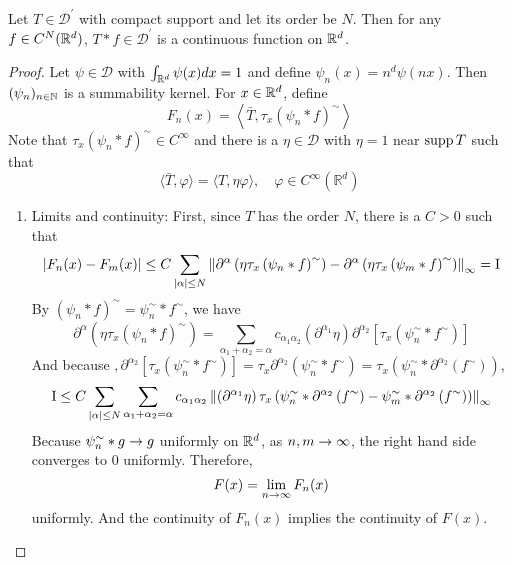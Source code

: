 \begin{enumerate}[label=\arabic*.]
	\begin{prop}
		Let $T \in \mathcal{D}^\prime$ with compact support and let its order be $N$. Then for any $f \in C^N(\mathbb{R}^d)$, $T * f \in \mathcal{D}^\prime$ is a continuous function on $\mathbb{R}^d$.
	\end{prop}
	\begin{proof}
		Let $\psi \in \mathcal{D}$ with $\int_{\mathbb{R}^d}\psi(x)dx = 1$ and define $\psi_n(x) = n^d\psi(nx)$. Then $(\psi_n)_{n \in \mathbb{N}}$ is a summability kernel. For $x \in \mathbb{R}^d$, define
		\begin{equation*}
			F_n(x)=\left\langle\bar{T}, \tau_x\left(\psi_n * f\right)^{\sim}\right\rangle
		\end{equation*}
		Note that $\tau_x\left(\psi_n * f\right)^{\sim} \in C^\infty$ and there is a $\eta \in \mathcal{D}$ with $\eta = 1$ near $\operatorname{supp} T$ such that
		\begin{equation*}
			\langle\bar{T}, \varphi\rangle=\langle T, \eta \varphi\rangle, \quad \varphi \in C^{\infty}\left(\mathbb{R}^d\right)
		\end{equation*}
		\begin{enumerate}
			\item Limits and continuity: First, since $T$ has the order $N$, there is a $C > 0$ such that
			\begin{equation*}
				\left|F_n(x)-F_m(x)\right| \leq C \sum_{|\alpha| \leq N}\left\|\partial^\alpha\left(\eta \tau_x\left(\psi_n * f\right)^{\sim}\right)-\partial^\alpha\left(\eta \tau_x\left(\psi_m * f\right)^{\sim}\right)\right\|_{\infty} = \text{\RNum{1}}
			\end{equation*}
			By $\left(\psi_n * f\right)^{\sim}=\psi_n^{\sim} * f^{\sim}$, we have
			\begin{equation*}
				\partial^\alpha\left(\eta \tau_x\left(\psi_n * f\right)^{\sim}\right)=\sum_{\alpha_1+\alpha_2=\alpha} c_{\alpha_1 \alpha_2}\left(\partial^{\alpha_1} \eta\right) \partial^{\alpha_2}\left[\tau_x\left(\psi_n^{\sim} * f^{\sim}\right)\right]
			\end{equation*}
			And because $, \partial^{\alpha_2}\left[\tau_x\left(\psi_n^{\sim} * f^{\sim}\right)\right]=\tau_x \partial^{\alpha_2}\left(\psi_n^{\sim} * f^{\sim}\right)=\tau_x\left(\psi_n^{\sim} * \partial^{\alpha_2}\left(f^{\sim}\right)\right)$,
			\begin{equation*}
				\text{\RNum{1}} \leq C \sum_{|\alpha| \leq N} \sum_{\alpha_1+\alpha_2=\alpha} c_{\alpha_1 \alpha_2}\left\|\left(\partial^{\alpha_1} \eta\right) \tau_x\left(\psi_n^{\sim} * \partial^{\alpha_2}\left(f^{\sim}\right)-\psi_m^{\sim} * \partial^{\alpha_2}\left(f^{\sim}\right)\right)\right\|_{\infty}
			\end{equation*}
			Because $\psi_n^{\sim} *  g \rightarrow g$ uniformly on $\mathbb{R}^d$, as $n,m \rightarrow \infty$, the right hand side converges to $0$ uniformly. Therefore, 
			\begin{equation*}
				F(x) = \lim_{n \rightarrow \infty}F_n(x)
			\end{equation*}
			uniformly. And the continuity of $F_n(x)$ implies the continuity of $F(x)$.


\end{enumerate}
\end{proof}
\end{enumerate}

